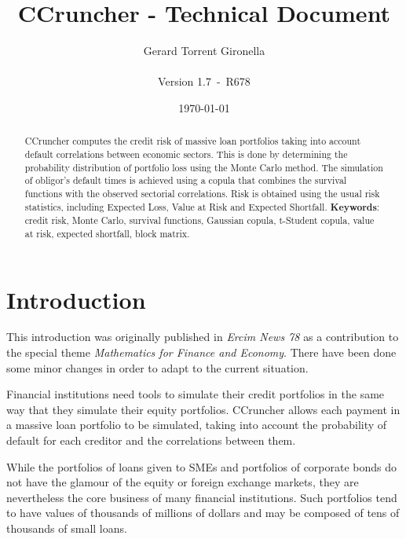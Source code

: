 \documentclass[a4paper,12pt,final]{article}
\def\numversion{1.7}
\def\svnversion{R678}
\begin{document}
\title{CCruncher - Technical Document}
\author{Gerard Torrent Gironella\\\\Version \numversion\ -\ \svnversion}
\date{\today}
\maketitle


\begin{abstract}
CCruncher computes the credit risk of massive loan portfolios 
taking into account default correlations between economic sectors. This is done 
by determining the probability distribution of portfolio loss using the Monte 
Carlo method. The simulation of obligor's default times is achieved
using a copula that combines the survival functions with the observed
sectorial correlations. Risk is obtained using the usual risk statistics, 
including Expected Loss, Value at Risk and Expected Shortfall.
\newline
\newline
\textbf{Keywords}: credit risk, Monte Carlo, survival functions, Gaussian copula, 
t-Student copula, value at risk, expected shortfall, block matrix.
\end{abstract}
\newpage


\tableofcontents
\newpage


\section{Introduction}

This introduction was originally published in \emph{Ercim News 78} \cite{ccruncher:ercim78}
as a contribution to the special theme \emph{Mathematics for Finance and Economy}.
There have been done some minor changes in order to adapt to the current situation.
\newline

Financial institutions need tools to simulate their credit portfolios in the same 
way that they simulate their equity portfolios. CCruncher allows each payment
in a massive loan portfolio to be simulated, taking into account the probability 
of default for each creditor and the correlations between them.
\newline

While the portfolios of loans given to SMEs and portfolios of corporate bonds do 
not have the glamour of the equity or foreign exchange markets, they are nevertheless 
the core business of many financial institutions. Such portfolios tend to have values 
of thousands of millions of dollars and may be composed of tens of thousands of small 
loans.
\newline
\end{document}
